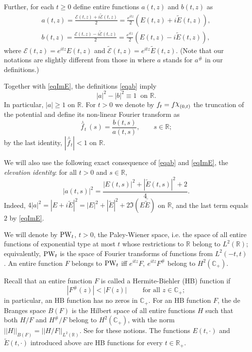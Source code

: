 \documentclass[11pt,twoside,reqno]{amsart}
\def\ti{\tilde}
\def\PW{\text{\rm PW}}
\def \nlhat {\overset{\ \curlywedge}}
\def\R{{\mathbb R}}
\def\C{{\mathbb{C}}}
\def\EE{{\mathcal E}}
\newcommand{\charf}{\raisebox{\depth}{\(\chi\)}}
\theoremstyle{plain}
\numberwithin{equation}{section}
\begin{document}
Further, for each $t\geq 0$ define entire functions $a(t,z)$ and $b(t,z)$ as
\begin{equation}\begin{gathered}a(t,z)=\frac {\EE(t,z) +i\ti\EE(t,z)}2=\frac {e^{itz}}2 (E(t,z)+i\ti E(t,z)), \\  b(t,z)=
		\frac {\EE(t,z) -i\ti\EE(t,z)}2=\frac {e^{itz}}2 (E(t,z)-i\ti E(t,z)),\label{eqab}\end{gathered}\end{equation}
where $\EE(t,z)=e^{itz}E(t,z)$ and $\ti\EE(t,z)=e^{itz}\ti E(t,z)$.
(Note that our notations are slightly different from those in \cite{TT} where $a$ stands for $a^\#$ in our definitions.)

Together with \eqref{eqImE}, the definitions \eqref{eqab} imply
$$|a|^2-|b|^2\equiv 1\ \text{ on }\R.$$
In particular, $|a|\geq 1$ on $\R$. For $t>0$ we denote by $f_t=f\charf_{(0,t)}$ the truncation of the potential and define its non-linear Fourier transform as
$$\nlhat f_t\,(s)=\frac{b(t,s)}{a(t,s)},\qquad s\in\R;$$
by the last identity, $|\nlhat f_t|<1$ on $\R$.

We will also use the following exact consequence of \eqref{eqab} and \eqref{eqImE}, the {\it elevation identity}: for all $t>0$ and $s\in\R$,
\begin{equation}
|a(t,s)|^2=\frac{|E(t,s)|^2+|\ti E(t,s)|^2+2}4 .
\label{eqAid}
\end{equation}
Indeed, $4|a|^2=|E+i\ti E|^2=|E|^2+|\ti E|^2+2\Im\left(E\bar{\ti E}\right)$ on $\R$, and the last term equals $2$ by \eqref{eqImE}.

We will denote by $\PW_t$, $t>0$, the Paley-Wiener space, i.e. the space of all entire functions of exponential type at most $t$ whose restrictions to $\R$ belong to $L^2(\R)$; equivalently, $\PW_t$ is the space of Fourier transforms of functions from $L^2(-t,t)$. An entire function $F$ belongs to $\PW_t$ iff $e^{itz}F,\ e^{itz}F^\#$ belong to $H^2(\C_+)$.

Recall that an entire function $F$ is called a Hermite-Biehler (HB) function if
$$|F^\#(z)|<|F(z)|\qquad\text{ for all }z\in\C_+;$$
in particular, an HB function has no zeros in $\C_+$. For an HB function $F$, the de Branges space $B(F)$ is the Hilbert space of all entire functions $H$ such that both $H/F$ and $H^\#/F$ belong to $H^2(\C_+)$, with the norm $||H||_{B(F)}=||H/F||_{L^2(\R)}$. See \cite{dBr} for these notions. The functions $E(t,\cdot)$ and $\ti E(t,\cdot)$ introduced above are HB functions for every $t\in\R_+$.
\end{document}
